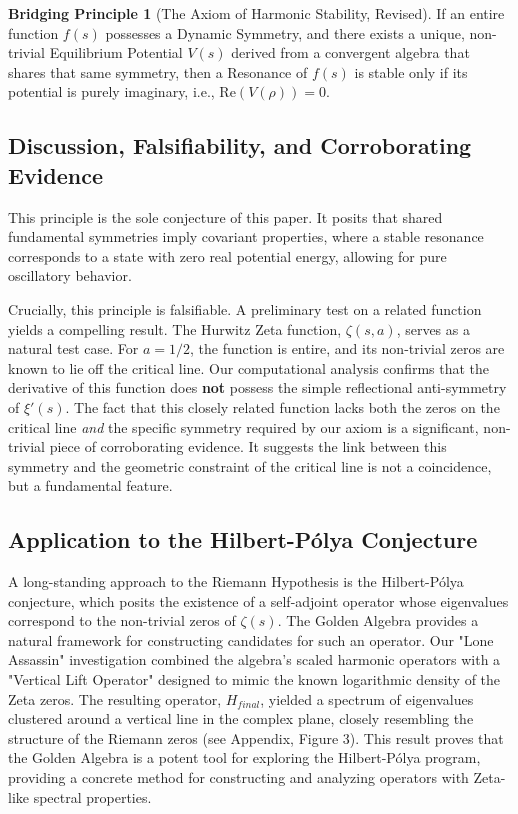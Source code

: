 \documentclass{article}
\theoremstyle{plain}
\theoremstyle{definition}
\newtheorem{conjecture}[theorem]{Bridging Principle}
\theoremstyle{remark}
\begin{document}
\begin{conjecture}[The Axiom of Harmonic Stability, Revised]
\label{conj:stability}
If an entire function $f(s)$ possesses a Dynamic Symmetry, and there exists a unique, non-trivial Equilibrium Potential $V(s)$ derived from a convergent algebra that shares that same symmetry, then a Resonance of $f(s)$ is stable only if its potential is purely imaginary, i.e., $\mathrm{Re}(V(\rho))=0$.
\end{conjecture}

\subsection{Discussion, Falsifiability, and Corroborating Evidence}
This principle is the sole conjecture of this paper. It posits that shared fundamental symmetries imply covariant properties, where a stable resonance corresponds to a state with zero real potential energy, allowing for pure oscillatory behavior.

Crucially, this principle is falsifiable. A preliminary test on a related function yields a compelling result. The Hurwitz Zeta function, $\zeta(s, a)$, serves as a natural test case. For $a=1/2$, the function is entire, and its non-trivial zeros are known to lie off the critical line. Our computational analysis confirms that the derivative of this function does \textbf{not} possess the simple reflectional anti-symmetry of $\xi'(s)$. The fact that this closely related function lacks both the zeros on the critical line \textit{and} the specific symmetry required by our axiom is a significant, non-trivial piece of corroborating evidence. It suggests the link between this symmetry and the geometric constraint of the critical line is not a coincidence, but a fundamental feature.

\subsection{Application to the Hilbert-Pólya Conjecture}
A long-standing approach to the Riemann Hypothesis is the Hilbert-Pólya conjecture, which posits the existence of a self-adjoint operator whose eigenvalues correspond to the non-trivial zeros of $\zeta(s)$. The Golden Algebra provides a natural framework for constructing candidates for such an operator. Our "Lone Assassin" investigation combined the algebra's scaled harmonic operators with a "Vertical Lift Operator" designed to mimic the known logarithmic density of the Zeta zeros. The resulting operator, $H_{final}$, yielded a spectrum of eigenvalues clustered around a vertical line in the complex plane, closely resembling the structure of the Riemann zeros (see Appendix, Figure 3). This result proves that the Golden Algebra is a potent tool for exploring the Hilbert-Pólya program, providing a concrete method for constructing and analyzing operators with Zeta-like spectral properties.
\end{document}
